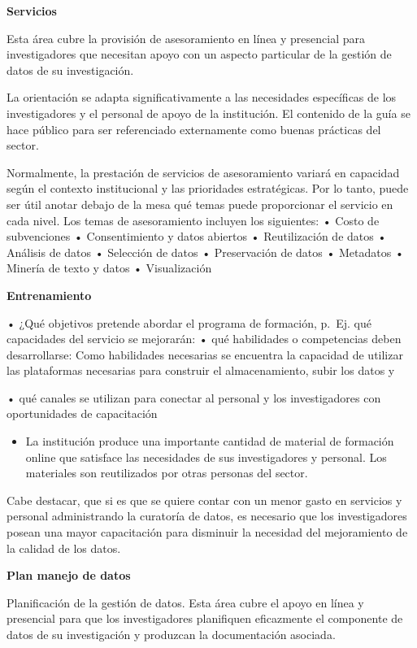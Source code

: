 \documentclass[
  14pt,
]{book}
\providecommand{\tightlist}{%
  \setlength{\itemsep}{0pt}\setlength{\parskip}{0pt}}
\begin{document}
\textbf{Servicios}

Esta área cubre la provisión de asesoramiento en línea y presencial para investigadores que necesitan apoyo con un aspecto particular de la gestión de datos de su investigación.

La orientación se adapta significativamente a las necesidades específicas de los investigadores y el personal de apoyo de la institución. El contenido de la guía se hace público para ser referenciado externamente como buenas prácticas del sector.

Normalmente, la prestación de servicios de asesoramiento variará en capacidad según el contexto institucional y las prioridades estratégicas. Por lo tanto, puede ser útil anotar debajo de la mesa qué temas puede proporcionar el servicio en cada nivel. Los temas de asesoramiento incluyen los siguientes:
• Costo de subvenciones
• Consentimiento y datos abiertos
• Reutilización de datos
• Análisis de datos
• Selección de datos
• Preservación de datos
• Metadatos
• Minería de texto y datos
• Visualización

\textbf{Entrenamiento}

• ¿Qué objetivos pretende abordar el programa de formación, p.~Ej. qué capacidades del servicio se mejorarán:
• qué habilidades o competencias deben desarrollarse: Como habilidades necesarias se encuentra la capacidad de utilizar las plataformas necesarias para construir el almacenamiento, subir los datos y

• qué canales se utilizan para conectar al personal y los investigadores con oportunidades de capacitación

\begin{itemize}
\tightlist
\item
  La institución produce una importante cantidad de material de formación online que satisface las necesidades de sus investigadores y personal. Los materiales son reutilizados por otras personas del sector.
\end{itemize}

Cabe destacar, que si es que se quiere contar con un menor gasto en servicios y personal administrando la curatoría de datos, es necesario que los investigadores posean una mayor capacitación para disminuir la necesidad del mejoramiento de la calidad de los datos.

\textbf{Plan manejo de datos}

Planificación de la gestión de datos. Esta área cubre el apoyo en línea y presencial para que los investigadores planifiquen eficazmente el componente de datos de su investigación y produzcan la documentación asociada.
\end{document}
